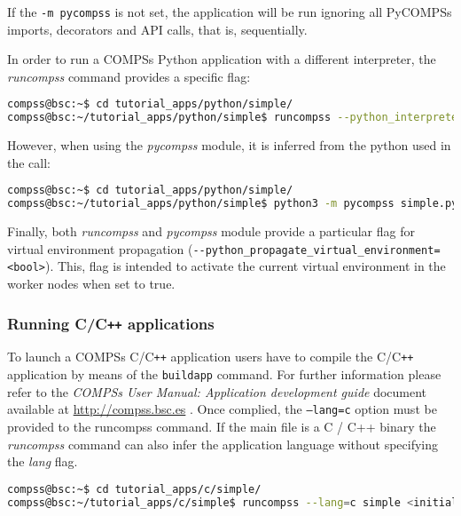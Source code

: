 If the \verb|-m pycompss| is not set, the application will be run ignoring all PyCOMPSs imports, decorators and API calls, that is, sequentially.

In order to run a COMPSs Python application with a different interpreter, the \textit{runcompss} command provides a specific flag:

\begin{lstlisting}[language=bash]
compss@bsc:~$ cd tutorial_apps/python/simple/
compss@bsc:~/tutorial_apps/python/simple$ runcompss --python_interpreter=python3 ./simple.py <initial_number>
\end{lstlisting}

However, when using the \textit{pycompss} module, it is inferred from the python used in the call:

\begin{lstlisting}[language=bash]
compss@bsc:~$ cd tutorial_apps/python/simple/
compss@bsc:~/tutorial_apps/python/simple$ python3 -m pycompss simple.py <initial_number>
\end{lstlisting}

Finally, both \textit{runcompss} and \textit{pycompss} module provide a particular flag for virtual environment propagation (\verb|--python_propagate_virtual_environment=<bool>|).
This, flag is intended to activate the current virtual environment in the worker nodes when set to true.


\subsubsection{Running C/C\texttt{++} applications}
To launch a COMPSs C/C\texttt{++} application users have to compile the C/C\texttt{++} application by means of the \texttt{buildapp} command.
For further information please refer to the \textit{COMPSs User Manual: Application development guide} document available at
\url{http://compss.bsc.es} . Once complied, the \texttt{--lang=c} option must be provided to the runcompss command. If the main file is 
a C / C++ binary the \textit{runcompss} command can also infer the application language without specifying the \textit{lang} flag. 

\begin{lstlisting}[language=bash]
compss@bsc:~$ cd tutorial_apps/c/simple/
compss@bsc:~/tutorial_apps/c/simple$ runcompss --lang=c simple <initial_number>
\end{lstlisting}


